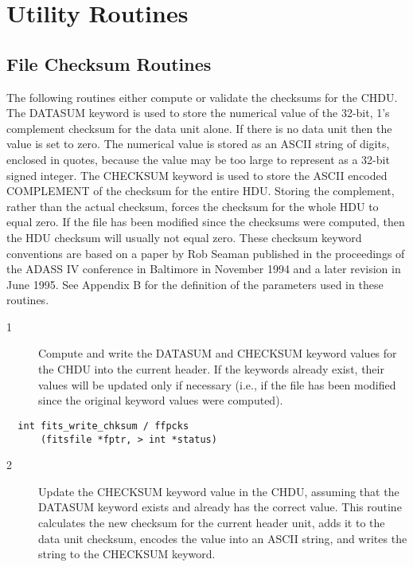 \documentclass[11pt]{book}
\begin{document}
\section{Utility Routines}


\subsection{File Checksum Routines}

The following routines either compute or validate the checksums for the
CHDU.  The DATASUM keyword is used to store the numerical value of the
32-bit, 1's complement checksum for the data unit alone.  If there is
no data unit then the value is set to zero. The numerical value is
stored as an ASCII string of digits, enclosed in quotes, because the
value may be too large to represent as a 32-bit signed integer.  The
CHECKSUM keyword is used to store the ASCII encoded COMPLEMENT of the
checksum for the entire HDU.  Storing the complement, rather than the
actual checksum, forces the checksum for the whole HDU to equal zero.
If the file has been modified since the checksums were computed, then
the HDU checksum will usually not equal zero.  These checksum keyword
conventions are based on a paper by Rob Seaman published in the
proceedings of the ADASS IV conference in Baltimore in November 1994
and a later revision in June 1995.  See Appendix B for the definition
of the parameters used in these routines.


\begin{description}
\item[1 ] Compute and write the DATASUM and CHECKSUM keyword values for the CHDU
    into the current header.  If the keywords already exist, their values
    will be updated only if necessary (i.e., if the file
    has been modified since the original keyword
   values were computed). \label{ffpcks}
\end{description}

\begin{verbatim}
  int fits_write_chksum / ffpcks
      (fitsfile *fptr, > int *status)
\end{verbatim}

\begin{description}
\item[2 ] Update the CHECKSUM keyword value in the CHDU, assuming that the
    DATASUM keyword exists and already has the correct value.  This routine
    calculates the new checksum for the current header unit, adds it to the
    data unit checksum, encodes the value into an ASCII string, and writes
   the string to the CHECKSUM keyword. \label{ffupck}
\end{description}
\end{document}
